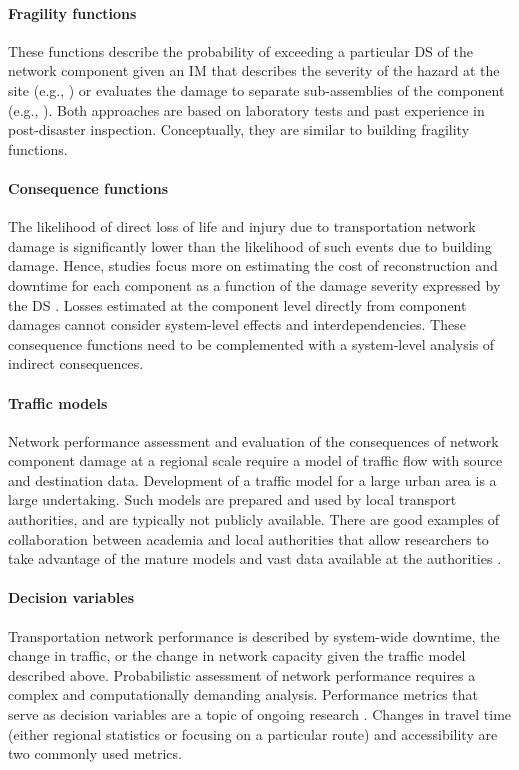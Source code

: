 \paragraph{Fragility functions} These functions describe the probability of exceeding a particular DS of the network component given an IM that describes the severity of the hazard at the site (e.g., \cite{balomenos2020parametrized}) or evaluates the damage to separate sub-assemblies of the component (e.g., \cite{nielson2007seismic, simon2016seismic}). Both approaches are based on laboratory tests and past experience in post-disaster inspection. Conceptually, they are similar to building fragility functions.

\paragraph{Consequence functions} The likelihood of direct loss of life and injury due to transportation network damage is significantly lower than the likelihood of such events due to building damage. Hence, studies focus more on estimating the cost of reconstruction and downtime for each component as a function of the damage severity expressed by the DS \citep{stergiou2006treatment, gidaris2017probabilistic}. Losses estimated at the component level directly from component damages cannot consider system-level effects and interdependencies. These consequence functions need to be complemented with a system-level analysis of indirect consequences.

\paragraph{Traffic models} Network performance assessment and evaluation of the consequences of network component damage at a regional scale require a model of traffic flow with source and destination data. Development of a traffic model for a large urban area is a large undertaking. Such models are prepared and used by local transport authorities, and are typically not publicly available. There are good examples of collaboration between academia and local authorities that allow researchers to take advantage of the mature models and vast data available at the authorities \citep{miller2015ground}.

\paragraph{Decision variables} Transportation network performance is described by system-wide downtime, the change in traffic, or the change in network capacity given the traffic model described above. Probabilistic assessment of network performance requires a complex and computationally demanding analysis. Performance metrics that serve as decision variables are a topic of ongoing research \citep{miller2015ground, millerhooks2012measuring}. Changes in travel time (either regional statistics or focusing on a particular route) and accessibility are two commonly used metrics.

